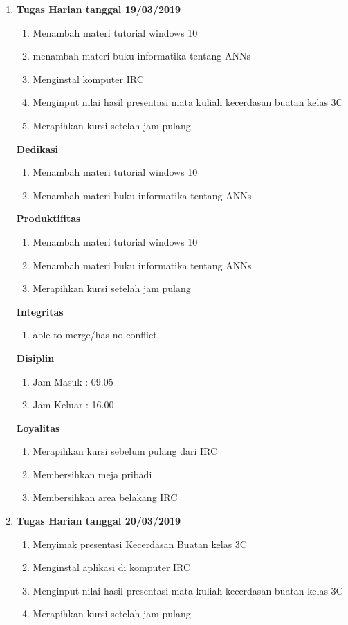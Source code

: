 \begin{enumerate}
\item \textbf{Tugas Harian tanggal 19/03/2019}
\begin{enumerate}
\item Menambah materi tutorial windows 10
\item menambah materi buku informatika tentang ANNs
\item Menginstal komputer IRC 
\item Menginput nilai hasil presentasi mata kuliah kecerdasan buatan kelas 3C
\item Merapihkan kursi setelah jam pulang
\end{enumerate}

\textbf{Dedikasi}
\begin{enumerate}
\item Menambah materi tutorial windows 10
\item Menambah materi buku informatika tentang ANNs
\end{enumerate}

\textbf{Produktifitas}
\begin{enumerate}
\item Menambah materi tutorial windows 10
\item Menambah materi buku informatika tentang ANNs
\item Merapihkan kursi setelah jam pulang
\end{enumerate}

\textbf{Integritas}
\begin{enumerate}
\item able to merge/has no conflict
\end{enumerate}

\textbf{Disiplin}
\begin{enumerate}
\item Jam Masuk : 09.05
\item Jam Keluar : 16.00
\end{enumerate}

\textbf{Loyalitas}
\begin{enumerate}
\item Merapihkan kursi sebelum pulang dari IRC
\item Membersihkan meja pribadi
\item Membersihkan area belakang IRC
\end{enumerate}

\item \textbf{Tugas Harian tanggal 20/03/2019}
\begin{enumerate}
\item Menyimak presentasi Kecerdasan Buatan kelas 3C
\item Menginstal aplikasi di komputer IRC
\item Menginput nilai hasil presentasi mata kuliah kecerdasan buatan kelas 3C
\item Merapihkan kursi setelah jam pulang
\end{enumerate}


\end{enumerate}
